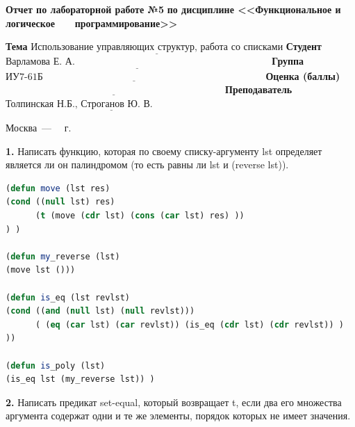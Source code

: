 \documentclass[12pt]{report}
\begin{document}
\begin{titlepage}
		\begin{center}
			\noindent\begin{minipage}{1.1\textwidth}\centering
				\Large\textbf{  Отчет по лабораторной работе №5}\newline
				\textbf{по дисциплине <<Функциональное и логическое}\newline
				\textbf{~~~программирование>>}\newline\newline
			\end{minipage}
		\end{center}
		
		\noindent\textbf{Тема} $\underline{\text{Использование управляющих структур, работа со списками}}$\newline\newline
		\noindent\textbf{Студент} $\underline{\text{Варламова Е. А.~~~~~~~~~~~~~~~~~~~~~~~~~~~~~~~~~~~~~~~~~~~~~~~~~~~~~~~~~~~~}}$\newline\newline
		\noindent\textbf{Группа} $\underline{\text{ИУ7-61Б~~~~~~~~~~~~~~~~~~~~~~~~~~~~~~~~~~~~~~~~~~~~~~~~~~~~~~~~~~~~~~~~~~~~}}$\newline\newline
		\noindent\textbf{Оценка (баллы)} $\underline{\text{~~~~~~~~~~~~~~~~~~~~~~~~~~~~~~~~~~~~~~~~~~~~~~~~~~~~~~~~~~~~~~~~~~~}}$\newline\newline
		\noindent\textbf{Преподаватель} $\underline{\text{Толпинская Н.Б., Строганов Ю. В.~~~~~~~~~~~~~~~~~~~~}}$\newline\newline\newline
		
		\begin{center}
			\vfill
			Москва~---~\the\year
			~г.
		\end{center}
	\end{titlepage}
\setcounter{page}{2}

\newpage

\textbf{1.} Написать функцию, которая по своему списку-аргументу lst определяет является ли он палиндромом (то есть равны ли lst и (reverse lst)).\\

\begin{lstlisting}[label=third,caption=Решение задания №1, language=lisp]
(defun move (lst res)
(cond ((null lst) res)
      (t (move (cdr lst) (cons (car lst) res) ))
) )

(defun my_reverse (lst)
(move lst ()))

(defun is_eq (lst revlst)
(cond ((and (null lst) (null revlst)))
      ( (eq (car lst) (car revlst)) (is_eq (cdr lst) (cdr revlst)) )
))

(defun is_poly (lst)
(is_eq lst (my_reverse lst)) )
\end{lstlisting}
\textbf{2.} Написать предикат set-equal, который возвращает t, если два его множества аргумента содержат одни и те же элементы, порядок которых не имеет значения.\\
\end{document}
